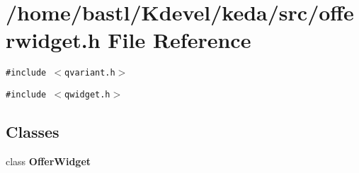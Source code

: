 \section{/home/bastl/Kdevel/keda/src/offerwidget.h File Reference}
\label{offerwidget_8h}
{\tt \#include $<$qvariant.h$>$}\par
{\tt \#include $<$qwidget.h$>$}\par
\subsection*{Classes}
\begin{CompactItemize}
\item 
class {\bf Offer\-Widget}
\end{CompactItemize}
